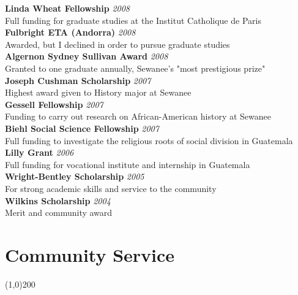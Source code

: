 \documentclass[11pt]{article}
\begin{document}
\noindent \textbf{Linda Wheat Fellowship}  \hfill \emph{2008}\\
\noindent Full funding for graduate studies at the Institut Catholique de Paris  \\

\noindent \textbf{Fulbright ETA (Andorra)}  \hfill \emph{2008}\\
\noindent Awarded, but I declined in order to pursue graduate studies \\

\noindent \textbf{Algernon Sydney Sullivan Award}  \hfill \emph{2008}\\
\noindent Granted to one graduate annually, Sewanee's "most prestigious prize" \\

\noindent \textbf{Joseph Cushman Scholarship}  \hfill \emph{2007}\\
\noindent Highest award given to History major at Sewanee \\

\noindent \textbf{Gessell Fellowship}  \hfill \emph{2007}\\
\noindent Funding to carry out research on African-American history at Sewanee\\

\noindent \textbf{Biehl Social Science Fellowship}  \hfill \emph{2007}\\
\noindent Full funding to investigate the religious roots of social division in Guatemala\\

\noindent \textbf{Lilly Grant}  \hfill \emph{2006}\\
\noindent Full funding for vocational institute and internship in Guatemala\\

\noindent \textbf{Wright-Bentley Scholarship}  \hfill \emph{2005}\\
\noindent For strong academic skills and service to the community\\

\noindent \textbf{Wilkins Scholarship}  \hfill \emph{2004}\\
\noindent Merit and community award\\

\section*{Community Service} %
\vspace{-7mm}
\line(1,0){200}
\vspace{2mm}
\end{document}
